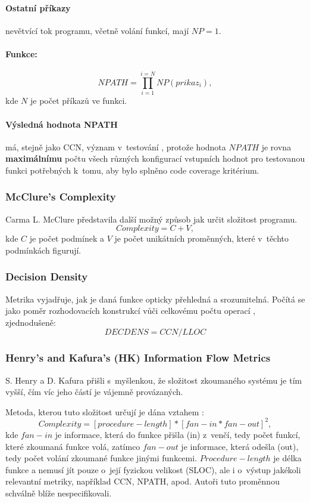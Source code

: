 \documentclass[11pt,twoside,a4paper]{book}
\begin{document}
\paragraph{Ostatní příkazy} nevětvící tok programu, včetně volání funkcí, mají $NP = 1$.

\paragraph{Funkce:}
$$NPATH = \prod_{i=1}^{i=N}{NP(prikaz_i)},$$
kde $N$ je počet příkazů ve funkci.

\paragraph{Výsledná hodnota NPATH} má, stejně jako CCN, význam v~testování \cite{NPATH}, protože hodnota $NPATH$ je rovna \textbf{maximálnímu} počtu
všech různých konfigurací vstupních hodnot pro testovanou funkci potřebných k~tomu, aby bylo splněno code coverage kritérium.

\subsubsection{McClure's Complexity}
Carma L. McClure představila další možný způsob \cite{MC} jak určit složitost programu.
$$Complexity = C + V,$$
kde $C$ je počet podmínek a $V$ je počet unikátních proměnných, které v~těchto podmínkách figurují.

\subsubsection{Decision Density}
\label{sec:DECDENS}
Metrika vyjadřuje, jak je daná funkce opticky přehledná a srozumitelná. Počítá se jako poměr rozhodovacích konstrukcí vůči celkovému počtu operací
\cite{PMComplexity}, zjednodušeně:
$$DECDENS = CCN / LLOC$$

\subsubsection{Henry's and Kafura's (HK) Information Flow Metrics}
\label{sec:HK}
S. Henry a D. Kafura přišli s~myšlenkou, že složitost zkoumaného systému je tím vyšší, čím víc jeho částí je vájemně provázaných.

Metoda, kterou tuto složitost určují je dána vztahem \cite{HKMYW}:
$$Complexity = [procedure-length] * [fan-in * fan-out]^2,$$
kde $fan-in$ je informace, která do funkce přišla (in) z~venčí, tedy počet funkcí, které zkoumaná funkce volá, zatímco $fan-out$
je informace, která odešla (out), tedy počet volání zkoumané funkce jinými funkcemi. $Procedure-length$ je délka funkce a nemusí
jít pouze o~její fyzickou velikost (SLOC), ale i o~výstup jakékoli relevantní metriky, například CCN, NPATH, apod.
Autoři tuto proměnnou schválně blíže nespecifikovali.
\end{document}
